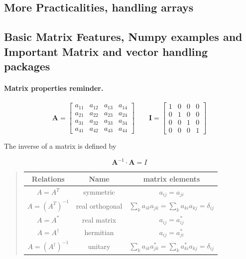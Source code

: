\documentclass[%
oneside,                 %
final,                   %
10pt]{article}
\begin{document}
\noindent
\subsection{More Practicalities, handling arrays}


\subsection{Basic Matrix Features, Numpy examples and Important Matrix and vector handling packages}


\paragraph{Matrix properties reminder.}
\[
 \mathbf{A} =
      \begin{bmatrix} a_{11} & a_{12} & a_{13} & a_{14} \\
                                 a_{21} & a_{22} & a_{23} & a_{24} \\
                                   a_{31} & a_{32} & a_{33} & a_{34} \\
                                  a_{41} & a_{42} & a_{43} & a_{44}
             \end{bmatrix}\qquad
\mathbf{I} =
      \begin{bmatrix} 1 & 0 & 0 & 0 \\
                                 0 & 1 & 0 & 0 \\
                                 0 & 0 & 1 & 0 \\
                                 0 & 0 & 0 & 1
             \end{bmatrix}
\]



The inverse of a matrix is defined by

\[
\mathbf{A}^{-1} \cdot \mathbf{A} = I
\]



\begin{quote}
\begin{tabular}{ccc}
\hline
\multicolumn{1}{c}{ Relations } & \multicolumn{1}{c}{ Name } & \multicolumn{1}{c}{ matrix elements } \\
\hline
$A = A^{T}$                            & symmetric       & $a_{ij} = a_{ji}$                                                       \\
$A = \left (A^{T} \right )^{-1}$       & real orthogonal & $\sum_k a_{ik} a_{jk} = \sum_k a_{ki} a_{kj} = \delta_{ij}$             \\
$A = A^{ * }$                          & real matrix     & $a_{ij} = a_{ij}^{ * }$                                                 \\
$A = A^{\dagger}$                      & hermitian       & $a_{ij} = a_{ji}^{ * }$                                                 \\
$A = \left (A^{\dagger} \right )^{-1}$ & unitary         & $\sum_k a_{ik} a_{jk}^{ * } = \sum_k a_{ki}^{ * } a_{kj} = \delta_{ij}$ \\
\hline
\end{tabular}
\end{quote}
\end{document}
